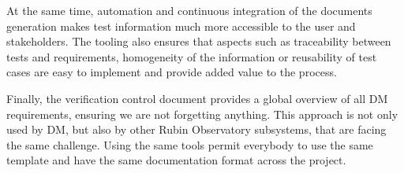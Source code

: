 At the same time, automation and continuous integration of the documents generation makes test information
much more accessible to the user and stakeholders.
The tooling also ensures that aspects such as traceability between tests and requirements, homogeneity of the information 
or reusability of test cases are easy to implement and provide added value to the process.

Finally, the verification control document provides a global overview of all DM requirements, ensuring we are not forgetting anything.
This approach is not only used by DM, but also by other Rubin Observatory subsystems, that are facing the same challenge.
Using the same tools permit everybody to use the same template and have the same documentation format across the project.



